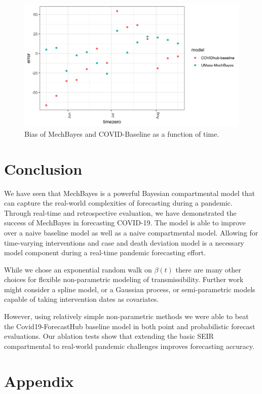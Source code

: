 \documentclass[11pt]{amsart}
\begin{document}
\begin{figure}
\centering
\includegraphics[scale=.15]{bias_by_timezero.png}
\caption{Bias of MechBayes and COVID-Baseline as a function of time.  }
\label{fig:results_discussion}
\end{figure}



\section{Conclusion}

We have seen that MechBayes is a powerful Bayesian compartmental model that can capture the real-world complexities of forecasting during a pandemic. Through real-time and retrospective evaluation, we have demonstrated the success of MechBayes in forecasting COVID-19. The model is able to improve over a naive baseline model as well as a naive compartmental model. Allowing for time-varying interventions and case and death deviation model is a necessary model component during a real-time pandemic forecasting effort. 

While we chose an exponential random walk on $\beta(t)$ there are many other choices for flexible non-parametric modeling of transmissibility. Further work might consider a spline model, or a Gaussian process, or semi-parametric models capable of taking intervention dates as covariates. 

However, using relatively simple non-parametric methods we were able to beat the Covid19-ForecastHub baseline model in both point and probabilistic forecast evaluations. Our ablation tests show that extending the basic SEIR compartmental to real-world pandemic challenges improves forecasting accuracy. 


\newpage

\section{Appendix}
\end{document}
